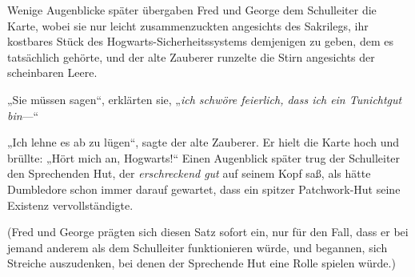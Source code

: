 Wenige Augenblicke später übergaben Fred und George dem Schulleiter die Karte, wobei sie nur leicht zusammenzuckten angesichts des Sakrilegs, ihr kostbares Stück des Hogwarts-Sicherheitssystems demjenigen zu geben, dem es tatsächlich gehörte, und der alte Zauberer runzelte die Stirn angesichts der scheinbaren Leere.

„Sie müssen sagen“, erklärten sie, „\emph{ich schwöre feierlich, dass ich ein Tunichtgut bin}—“

„Ich lehne es ab zu lügen“, sagte der alte Zauberer. Er hielt die Karte hoch und brüllte: „Hört mich an, Hogwarts!“ 
Einen Augenblick später trug der Schulleiter den Sprechenden Hut, der \emph{erschreckend gut} auf seinem Kopf saß, als hätte Dumbledore schon immer darauf gewartet, dass ein spitzer Patchwork-Hut seine Existenz vervollständigte.

(Fred und George prägten sich diesen Satz sofort ein, nur für den Fall, dass er bei jemand anderem als dem Schulleiter funktionieren würde, und begannen, sich Streiche auszudenken, bei denen der Sprechende Hut eine Rolle spielen würde.)

